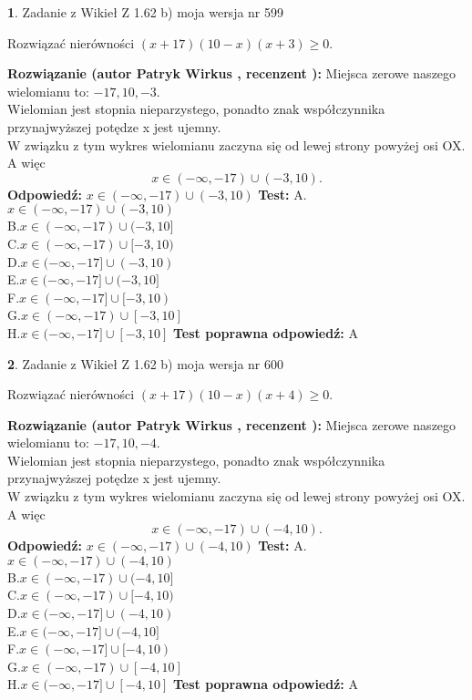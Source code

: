 \documentclass[12pt, a4paper]{article}
\theoremstyle{definition} %
\newtheorem{zad}{}
\newcommand{\zadStart}[1]{\begin{zad}#1\newline}
\newcommand{\zadStop}{\end{zad}}
\newcommand{\rozwStart}[2]{\noindent \textbf{Rozwiązanie (autor #1 , recenzent #2): }\newline}
\newcommand{\rozwStop}{\newline}
\newcommand{\odpStart}{\noindent \textbf{Odpowiedź:}\newline}
\newcommand{\odpStop}{\newline}
\newcommand{\testStart}{\noindent \textbf{Test:}\newline}
\newcommand{\testStop}{\newline}
\newcommand{\kluczStart}{\noindent \textbf{Test poprawna odpowiedź:}\newline}
\newcommand{\kluczStop}{\newline}
\begin{document}
\zadStart{Zadanie z Wikieł Z 1.62 b) moja wersja nr 599}

Rozwiązać nierówności $(x+17)(10-x)(x+3)\ge0$.
\zadStop
\rozwStart{Patryk Wirkus}{}
Miejsca zerowe naszego wielomianu to: $-17, 10, -3$.\\
Wielomian jest stopnia nieparzystego, ponadto znak współczynnika przy\linebreak najwyższej potędze x jest ujemny.\\ W związku z tym wykres wielomianu zaczyna się od lewej strony powyżej osi OX. A więc $$x \in (-\infty,-17) \cup (-3,10).$$
\rozwStop
\odpStart
$x \in (-\infty,-17) \cup (-3,10)$
\odpStop
\testStart
A.$x \in (-\infty,-17) \cup (-3,10)$\\
B.$x \in (-\infty,-17) \cup (-3,10]$\\
C.$x \in (-\infty,-17) \cup [-3,10)$\\
D.$x \in (-\infty,-17] \cup (-3,10)$\\
E.$x \in (-\infty,-17] \cup (-3,10]$\\
F.$x \in (-\infty,-17] \cup [-3,10)$\\
G.$x \in (-\infty,-17) \cup [-3,10]$\\
H.$x \in (-\infty,-17] \cup [-3,10]$
\testStop
\kluczStart
A
\kluczStop



\zadStart{Zadanie z Wikieł Z 1.62 b) moja wersja nr 600}

Rozwiązać nierówności $(x+17)(10-x)(x+4)\ge0$.
\zadStop
\rozwStart{Patryk Wirkus}{}
Miejsca zerowe naszego wielomianu to: $-17, 10, -4$.\\
Wielomian jest stopnia nieparzystego, ponadto znak współczynnika przy\linebreak najwyższej potędze x jest ujemny.\\ W związku z tym wykres wielomianu zaczyna się od lewej strony powyżej osi OX. A więc $$x \in (-\infty,-17) \cup (-4,10).$$
\rozwStop
\odpStart
$x \in (-\infty,-17) \cup (-4,10)$
\odpStop
\testStart
A.$x \in (-\infty,-17) \cup (-4,10)$\\
B.$x \in (-\infty,-17) \cup (-4,10]$\\
C.$x \in (-\infty,-17) \cup [-4,10)$\\
D.$x \in (-\infty,-17] \cup (-4,10)$\\
E.$x \in (-\infty,-17] \cup (-4,10]$\\
F.$x \in (-\infty,-17] \cup [-4,10)$\\
G.$x \in (-\infty,-17) \cup [-4,10]$\\
H.$x \in (-\infty,-17] \cup [-4,10]$
\testStop
\kluczStart
A
\kluczStop
\end{document}

